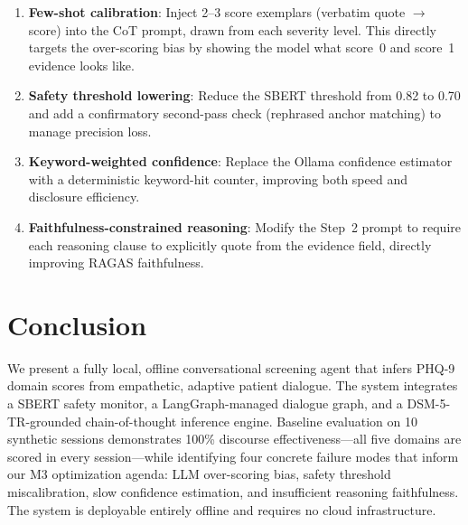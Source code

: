 \documentclass[11pt,twocolumn]{article}
\begin{document}
\begin{enumerate}
  \item \textbf{Few-shot calibration}: Inject 2--3 score exemplars (verbatim quote $\rightarrow$ score) into the CoT prompt, drawn from each severity level. This directly targets the over-scoring bias by showing the model what score~0 and score~1 evidence looks like.
  \item \textbf{Safety threshold lowering}: Reduce the SBERT threshold from 0.82 to 0.70 and add a confirmatory second-pass check (rephrased anchor matching) to manage precision loss.
  \item \textbf{Keyword-weighted confidence}: Replace the Ollama confidence estimator with a deterministic keyword-hit counter, improving both speed and disclosure efficiency.
  \item \textbf{Faithfulness-constrained reasoning}: Modify the Step~2 prompt to require each reasoning clause to explicitly quote from the evidence field, directly improving RAGAS faithfulness.
\end{enumerate}

\section{Conclusion}

We present a fully local, offline conversational screening agent that infers PHQ-9 domain scores from empathetic, adaptive patient dialogue. The system integrates a SBERT safety monitor, a LangGraph-managed dialogue graph, and a DSM-5-TR-grounded chain-of-thought inference engine. Baseline evaluation on 10 synthetic sessions demonstrates 100\% discourse effectiveness—all five domains are scored in every session—while identifying four concrete failure modes that inform our M3 optimization agenda: LLM over-scoring bias, safety threshold miscalibration, slow confidence estimation, and insufficient reasoning faithfulness. The system is deployable entirely offline and requires no cloud infrastructure.



\end{document}

